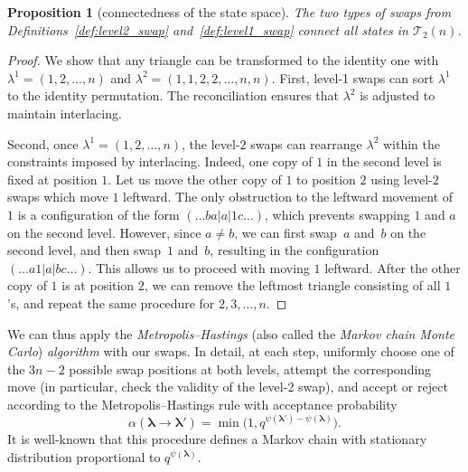 \documentclass[10pt,a4paper]{amsart}
\numberwithin{equation}{section}
\newtheorem{Proposition}[Theorem]{Proposition}
\theoremstyle{definition}
\begin{document}
\begin{Proposition}[connectedness of the state space]
	\label{prop:connected_state_space} The two types of swaps from
	Definitions~{\rm \ref{def:level2_swap}} and~{\rm \ref{def:level1_swap}} connect all states in
	$\mathcal{T}_2(n)$.
\end{Proposition}
\begin{proof}
	We show that any triangle can be transformed to the identity one with
	$\lambda^1 = (1, 2, \dots, n)$ and
	$\lambda^2 = (1, 1, 2, 2, \dots, n, n)$.
	First, level-1 swaps can sort $\lambda^1$ to the identity permutation.
	The reconciliation ensures that $\lambda^2$ is adjusted to maintain
	interlacing.

	Second, once $\lambda^1 = (1, 2, \dots, n)$, the level-$2$ swaps can
	rearrange $\lambda^2$ within the constraints imposed by interlacing.
	Indeed, one copy of $1$ in the second level is fixed at position $1$.
	Let us move the other copy of $1$ to position $2$ using level-$2$ swaps
	which move $1$ leftward.
	The only obstruction to the leftward movement of $1$ is a configuration of
	the form $(\dots b a|a|1c\dots)$, which prevents swapping $1$ and $a$ on
	the second level.
	However, since $a\ne b$, we can first swap~$a$ and~$b$ on the second level,
	and then swap~$1$ and~$b$, resulting in the configuration
	$(\dots a1|a|bc\dots)$.
	This allows us to proceed with moving $1$ leftward.
	After the other copy of $1$ is at position $2$, we can remove the leftmost
	triangle consisting of all $1$'s, and repeat the same procedure for
	$2,3,\dots,n$.
\end{proof}

We can thus apply the \emph{Metropolis--Hastings} (also called the \emph{Markov
chain Monte Carlo}) \emph{algorithm} with our swaps.
In detail, at each step, uniformly choose one of the $3n-2$ possible swap
positions at both levels, attempt the corresponding move (in particular, check
the validity of the level-2 swap), and accept or reject according to the
Metropolis--Hastings rule with acceptance probability
\begin{equation*}
	\alpha(\boldsymbol\lambda \to \boldsymbol\lambda') = \min\bigl(1,
	q^{\psi(\boldsymbol\lambda') - \psi(\boldsymbol\lambda)}\bigr).
\end{equation*}
It is well-known
\cite{LevinPeres2017}
that this procedure defines a Markov chain with stationary distribution
proportional to $q^{\psi(\boldsymbol\lambda)}$.
\end{document}
